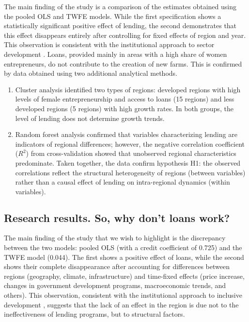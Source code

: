\documentclass[pdflatex,sn-mathphys-ay]{sn-jnl}
\begin{document}
The main finding of the study is a comparison of the estimates obtained
using the pooled OLS and TWFE models. While the first specification
shows a statistically significant positive effect of lending, the second
demonstrates that this effect disappears entirely after controlling for
fixed effects of region and year. This observation is consistent with
the institutional approach to sector development \citep{ref78,ref90}. Loans, provided mainly in areas with a
high share of women entrepreneurs, do not contribute to the creation of
new farms. This is confirmed by data obtained using two additional
analytical methods.

\begin{enumerate}
\item Cluster analysis identified two types of regions: developed
regions with high levels of female entrepreneurship and access to loans
(15 regions) and less developed regions (5 regions) with high growth
rates. In both groups, the level of lending does not determine growth
trends.

\item Random forest analysis confirmed that variables characterizing
lending are indicators of regional differences; however, the negative
correlation coefficient ($R^2$) from cross-validation showed that
unobserved regional characteristics predominate. Taken together, the
data confirm hypothesis H1: the observed correlations reflect the
structural heterogeneity of regions (between variables) rather than a
causal effect of lending on intra-regional dynamics (within variables).
\end{enumerate}

\subsection{Research results. So, why don't loans work?}

The main finding of the study that we wish to highlight is the
discrepancy between the two models: pooled OLS (with a credit
coefficient of 0.725) and the TWFE model (0.044). The first shows a
positive effect of loans, while the second shows their complete
disappearance after accounting for differences between regions
(geography, climate, infrastructure) and time-fixed effects (price
increase, changes in government development programs, macroeconomic
trends, and others). This observation, consistent with the institutional
approach to inclusive development \citep{ref78,ref90}, suggests that the lack of an effect in the
region is due not to the ineffectiveness of lending programs, but to
structural factors.
\end{document}
